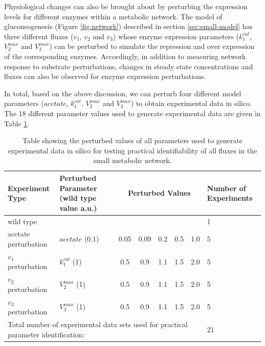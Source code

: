 \documentclass[10pt]{article}
\begin{document}
	Physiological changes can also be brought about by perturbing the expression levels for different enzymes within a metabolic network. The model of gluconeogenesis (Figure \ref{fig:network}) described in section \ref{sec:small-model} has three different fluxes ($v_1$, $v_2$ and $v_3$) whose enzyme expression parameters ($k_1^{cat}$, $V_2^{max}$ and $V_3^{max}$) can be perturbed to simulate the repression and over expression of the corresponding enzymes. Accordingly, in addition to measuring network response to substrate perturbations, changes in steady state concentrations and fluxes can also be observed for enzyme expression perturbations.
	
	In total, based on the above discussion, we can perturb four different model parameters ($acetate$, $k_1^{cat}$, $V_2^{max}$ and $V_3^{max}$) to obtain experimental data in silico. The 18 different parameter values used to generate experimental data are given in Table \ref{tab:pval}.	
	\begin{table}[!thbp]
		\caption{Table showing the perturbed values of all parameters used to generate experimental data in silico for testing practical identifiability of all fluxes in the small metabolic network.}
		\begin{center}				
			\begin{tabular}{lp{3.5cm}cccccp{2cm}}
				\hline
				Experiment Type & Perturbed Parameter (wild type value a.u.)& \multicolumn{5}{c}{Perturbed Values} & Number of Experiments\\
				\hline
				wild type &  &\multicolumn{5}{l}{} & 1\\
				acetate perturbation & $acetate$ (0.1) & 0.05 & 0.09 & 0.2 & 0.5 & 1.0 & 5\\
				$v_1$ perturbation & $k_1^{cat}$ (1) & 0.5 & 0.9 & 1.1 & 1.5 & 2.0 & 5\\				
				$v_2$ perturbation & $V_2^{max}$ (1) & 0.5 & 0.9 & 1.1 & 1.5 & 2.0 & 5\\								
				$v_3$ perturbation & $V_3^{max}$ (1) & 0.5 & 0.9 & 1.1 & 1.5 & 2.0 & 5\\
				\hline
				\multicolumn{7}{l}{Total number of experimental data sets used for practical parameter identification:} & 21\\
				\hline
			\end{tabular}
		\end{center}	
		\label{tab:pval}
	\end{table}	
	
\end{document}
